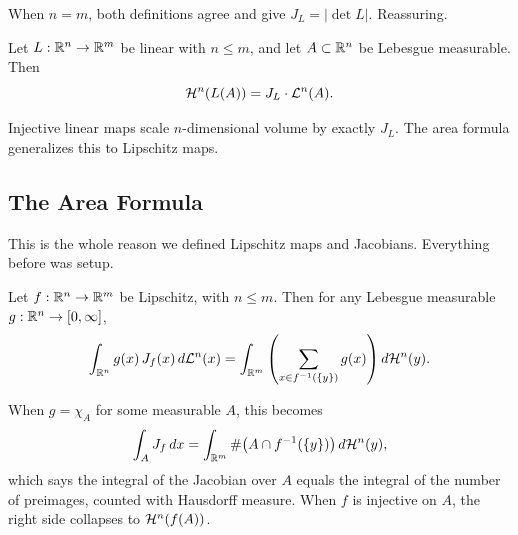 When $n = m$, both definitions agree and give $J_L = |\det L|$. Reassuring.

\begin{lemma}
\label{lem:linear-change}
Let $L : \mathbb{R}^n \to \mathbb{R}^m$ be linear with $n \leq m$, and let $A \subset \mathbb{R}^n$ be Lebesgue measurable. Then
\[
  \mathcal{H}^n(L(A)) = J_L \cdot \mathcal{L}^n(A).
\]
\end{lemma}

Injective linear maps scale $n$-dimensional volume by exactly $J_L$. The area formula generalizes this to Lipschitz maps.


\subsection{The Area Formula}
\label{thm:area-formula}

This is the whole reason we defined Lipschitz maps and Jacobians. Everything before was setup.

\begin{theorem}
\label{thm:area}
Let $f : \mathbb{R}^n \to \mathbb{R}^m$ be Lipschitz, with $n \leq m$. Then for any Lebesgue measurable $g : \mathbb{R}^n \to [0, \infty]$,
\[
  \int_{\mathbb{R}^n} g(x) \, J_f(x) \, d\mathcal{L}^n(x) = \int_{\mathbb{R}^m} \left( \sum_{x \in f^{-1}(\{y\})} g(x) \right) d\mathcal{H}^n(y).
\]
\end{theorem}

When $g = \chi_A$ for some measurable $A$, this becomes
\[
  \int_A J_f \, dx = \int_{\mathbb{R}^m} \#\bigl(A \cap f^{-1}(\{y\})\bigr) \, d\mathcal{H}^n(y),
\]
which says the integral of the Jacobian over $A$ equals the integral of the number of preimages, counted with Hausdorff measure. When $f$ is injective on $A$, the right side collapses to $\mathcal{H}^n(f(A))$.

